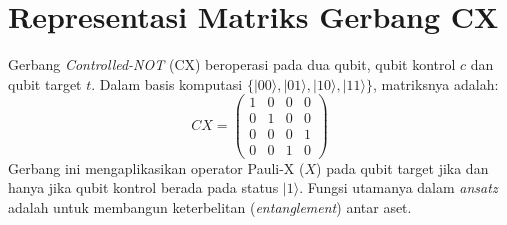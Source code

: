 \section{Representasi Matriks Gerbang CX}
Gerbang \textit{Controlled-NOT} (CX) beroperasi pada dua qubit, qubit kontrol $c$ dan qubit target $t$.
Dalam basis komputasi $\{|00\rangle, |01\rangle, |10\rangle, |11\rangle\}$, matriksnya adalah:
\begin{equation}
CX = \begin{pmatrix} 1 & 0 & 0 & 0 \\ 0 & 1 & 0 & 0 \\ 0 & 0 & 0 & 1 \\ 0 & 0 & 1 & 0 \end{pmatrix}
\end{equation}
Gerbang ini mengaplikasikan operator Pauli-X ($X$) pada qubit target jika dan hanya jika qubit kontrol berada pada status $|1\rangle$.
Fungsi utamanya dalam \textit{ansatz} adalah untuk membangun keterbelitan (\textit{entanglement}) antar aset.
